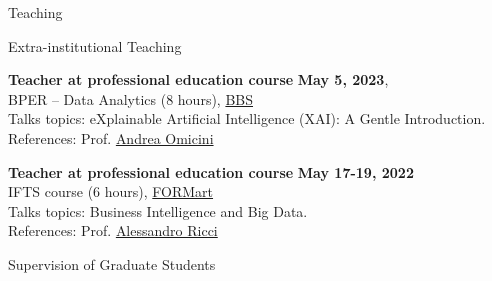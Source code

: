 \documentclass{resume} %
\begin{document}
\begin{rSection}{Teaching}
        \begin{rSubsection2}{Extra-institutional Teaching}
            \item\textbf{ Teacher at professional education course }\hfill \textbf{May 5, 2023},
            \\BPER -- Data Analytics (8 hours), \href{https://www.bbs.unibo.eu/}{BBS}
            \\Talks topics: eXplainable Artificial Intelligence (XAI): A Gentle Introduction.
            \\References:  Prof. \href{mailto:andrea.omicini@unibo.it}{Andrea Omicini}
            \item\textbf{ Teacher at professional education course }\hfill \textbf{May 17-19, 2022}
            \\IFTS course (6 hours), \href{http://www.formart.it/home}{FORMart}
            \\Talks topics: Business Intelligence and Big Data.
            \\References:  Prof. \href{mailto:a.ricci@unibo.it}{Alessandro Ricci}
        \end{rSubsection2}


        \begin{rSubsection2}{Supervision of Graduate Students}


\end{rSubsection2}
\end{rSection}
\end{document}
